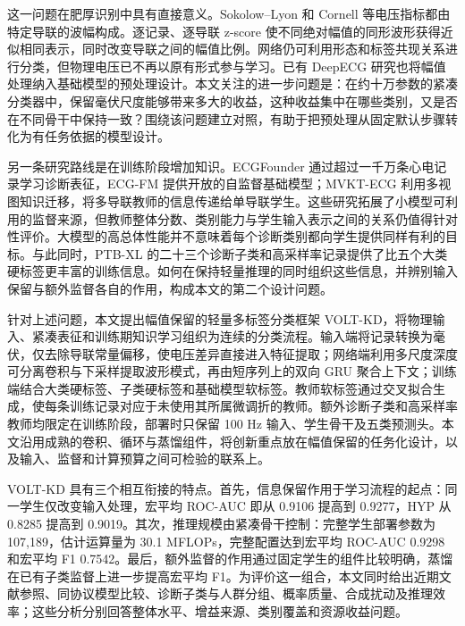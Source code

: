 \documentclass[11pt,a4paper,UTF8,fontset=windows]{ctexart}
\begin{document}
这一问题在肥厚识别中具有直接意义。Sokolow--Lyon 和 Cornell 等电压指标都由特定导联的波幅构成\cite{sokolow1949,casale1985,hancock2009}。逐记录、逐导联 z-score 使不同绝对幅值的同形波形获得近似相同表示，同时改变导联之间的幅值比例。网络仍可利用形态和标签共现关系进行分类，但物理电压已不再以原有形式参与学习。已有 DeepECG 研究也将幅值处理纳入基础模型的预处理设计\cite{nolin2026}。本文关注的进一步问题是：在约十万参数的紧凑分类器中，保留毫伏尺度能够带来多大的收益，这种收益集中在哪些类别，又是否在不同骨干中保持一致？围绕该问题建立对照，有助于把预处理从固定默认步骤转化为有任务依据的模型设计。

另一条研究路线是在训练阶段增加知识。ECGFounder\cite{li2025} 通过超过一千万条心电记录学习诊断表征，ECG-FM\cite{mckeen2025} 提供开放的自监督基础模型；MVKT-ECG\cite{qin2023} 利用多视图知识迁移，将多导联教师的信息传递给单导联学生。这些研究拓展了小模型可利用的监督来源，但教师整体分数、类别能力与学生输入表示之间的关系仍值得针对性评价。大模型的高总体性能并不意味着每个诊断类别都向学生提供同样有利的目标。与此同时，PTB-XL 的二十三个诊断子类和高采样率记录提供了比五个大类硬标签更丰富的训练信息。如何在保持轻量推理的同时组织这些信息，并辨别输入保留与额外监督各自的作用，构成本文的第二个设计问题。

针对上述问题，本文提出幅值保留的轻量多标签分类框架 VOLT-KD，将物理输入、紧凑表征和训练期知识学习组织为连续的分类流程。输入端将记录转换为毫伏，仅去除导联常量偏移，使电压差异直接进入特征提取；网络端利用多尺度深度可分离卷积与下采样提取波形模式，再由短序列上的双向 GRU 聚合上下文；训练端结合大类硬标签、子类硬标签和基础模型软标签。教师软标签通过交叉拟合生成，使每条训练记录对应于未使用其所属微调折的教师。额外诊断子类和高采样率教师均限定在训练阶段，部署时只保留 100 Hz 输入、学生骨干及五类预测头。本文沿用成熟的卷积、循环与蒸馏组件，将创新重点放在幅值保留的任务化设计，以及输入、监督和计算预算之间可检验的联系上。

VOLT-KD 具有三个相互衔接的特点。首先，信息保留作用于学习流程的起点：同一学生仅改变输入处理，宏平均 ROC-AUC 即从 0.9106 提高到 0.9277，HYP 从 0.8285 提高到 0.9019。其次，推理规模由紧凑骨干控制：完整学生部署参数为 107,189，估计运算量为 30.1 MFLOPs，完整配置达到宏平均 ROC-AUC 0.9298 和宏平均 F1 0.7542。最后，额外监督的作用通过固定学生的组件比较明确，蒸馏在已有子类监督上进一步提高宏平均 F1。为评价这一组合，本文同时给出近期文献参照、同协议模型比较、诊断子类与人群分组、概率质量、合成扰动及推理效率；这些分析分别回答整体水平、增益来源、类别覆盖和资源收益问题。
\end{document}

